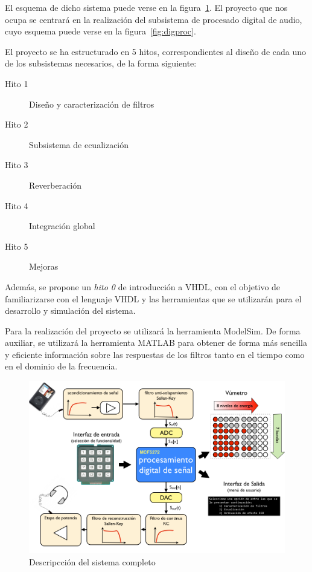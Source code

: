 \documentclass[a4paper,12pt]{report}
\begin{document}
El esquema de dicho sistema puede verse en la figura~\ref{fig:sysdesc}. El proyecto que nos ocupa se centrará en la realización del subsistema de procesado digital de audio, cuyo esquema puede verse en la figura~\ref{fig:digproc}.

El proyecto se ha estructurado en 5 hitos, correspondientes al diseño de cada uno de los subsistemas necesarios, de la forma siguiente:

\begin{description}
\item[Hito 1] Diseño y caracterización de filtros
\item[Hito 2] Subsistema de ecualización
\item[Hito 3] Reverberación
\item[Hito 4] Integración global
\item[Hito 5] Mejoras
\end{description}

Además, se propone un \emph{hito 0} de introducción a VHDL, con el objetivo de familiarizarse con el lenguaje VHDL y las herramientas que se utilizarán para el desarrollo y simulación del sistema.

Para la realización del proyecto se utilizará la herramienta ModelSim. De forma auxiliar, se utilizará la herramienta MATLAB para obtener de forma más sencilla y eficiente información sobre las respuestas de los filtros tanto en el tiempo como en el dominio de la frecuencia.

\begin{figure}[hbt]
\includegraphics[width=\textwidth]{img/system_description.png} 
\caption{Descripcción del sistema completo} \label{fig:sysdesc}
\end{figure}
\end{document}
